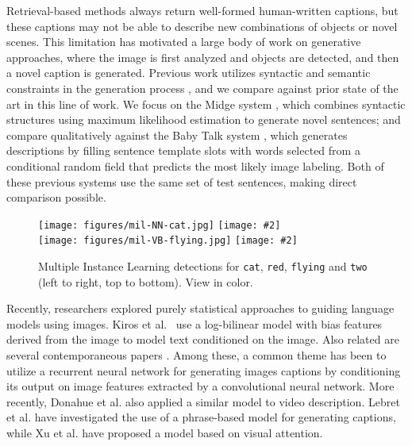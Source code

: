 \documentclass[10pt,twocolumn,letterpaper]{article}
\newcommand{\insertW}[2]{\texttt{[image: \#2]}}
\begin{document}
Retrieval-based methods always return well-formed human-written captions, but these captions may not be able to describe new combinations of objects or novel scenes. This limitation has motivated a large body of work on generative approaches, where the image is first analyzed and objects are detected, and then a novel caption is generated. Previous work utilizes syntactic and semantic constraints in the generation process \cite{mitchell2012midge,yao2010i2t,li2011composing,kuznetsova2012collective,kulkarni2011baby,yang2011corpus}, and we compare against prior state of the art in this line of work.  We focus on the Midge system \cite{mitchell2012midge}, which combines syntactic structures using maximum likelihood estimation to generate novel sentences; and compare qualitatively against the Baby Talk system \cite{kulkarni2011baby}, which generates descriptions by filling sentence template slots with words selected from a conditional random field that predicts the most likely image labeling.  Both of these previous systems use the same set of test sentences, making direct comparison possible.

\begin{figure}\centering
    \texttt{[image: figures/mil-NN-cat.jpg]}
    \insertW{0.23}{figures/mil-JJ-red.jpg}\\
    \vspace{1pt}
    \texttt{[image: figures/mil-VB-flying.jpg]}
    \insertW{0.23}{figures/mil-two.jpg}
    \caption{Multiple Instance Learning detections for \texttt{cat}, \texttt{red}, \texttt{flying} and \texttt{two} (left to right, top to bottom). View in color.}
\label{fig:mil-detect}
\end{figure}

Recently, researchers explored purely statistical approaches to guiding language models using images. Kiros et al.~\cite{kiros2013multimodal} use a log-bilinear model with bias features derived from the image to model text conditioned on the image. Also related are several contemporaneous papers \cite{mao2014explain,Vinyals2014b,Chen2014,Karpathy2014b,Donahue2014a,Xu2015,Lebret2015}. Among these, a common theme \cite{mao2014explain,Vinyals2014b,Chen2014,Karpathy2014b} has been to utilize a recurrent neural network for generating images captions by conditioning its output on image features extracted by a convolutional neural network. More recently, Donahue et al. \cite{Donahue2014a} also applied a similar model to video description. Lebret et al. \cite{Lebret2015} have investigated the use of a phrase-based model for generating captions, while Xu et al. \cite{Xu2015} have proposed a model based on visual attention.
\end{document}

